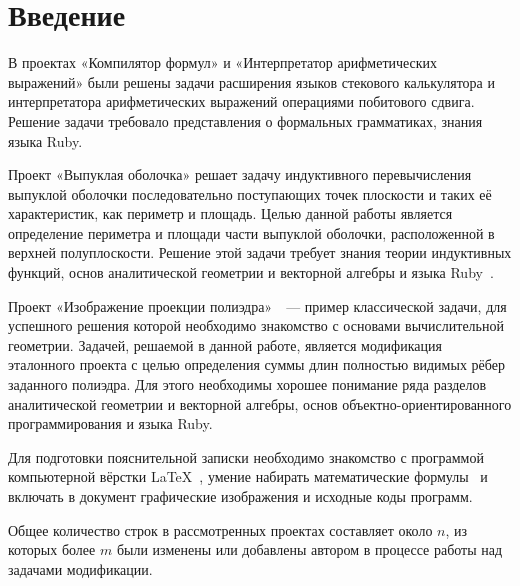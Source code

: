 \section{Введение}

В проектах «Компилятор формул» и «Интерпретатор арифметических
выражений» были решены задачи расширения языков стекового калькулятора
и интерпретатора арифметических выражений операциями побитового сдвига.
Решение задачи требовало представления о формальных грамматиках,
знания языка Ruby.

Проект «Выпуклая оболочка»\cite{convex} решает задачу индуктивного
перевычисления
выпуклой оболочки последовательно поступающих точек плоскости и таких её
характеристик, как периметр и площадь. Целью данной работы является
определение периметра и площади части выпуклой оболочки, расположенной
в верхней полуплоскости. Решение этой задачи требует знания теории индуктивных
функций, основ аналитической геометрии и векторной алгебры
и языка Ruby~\cite{ruby}.

Проект «Изображение проекции полиэдра»~\cite{polyedr}~--- пример
классической задачи, для успешного решения которой необходимо знакомство с
основами вычислительной геометрии. Задачей, решаемой в данной работе, является
модификация эталонного проекта с целью определения суммы длин полностью видимых
рёбер заданного полиэдра. Для этого необходимы хорошее понимание ряда разделов
аналитической геометрии и векторной алгебры, основ объектно-ориентированного
программирования и языка Ruby.

Для подготовки пояснительной записки необходимо знакомство с программой
компьютерной вёрстки \LaTeX~\cite{rlatex}, умение набирать математические
формулы~\cite{texbook} и включать в документ графические изображения и исходные
коды программ.

Общее количество строк в рассмотренных проектах составляет около $n$, из которых
более $m$ были изменены или добавлены автором в процессе работы
над задачами модификации.
